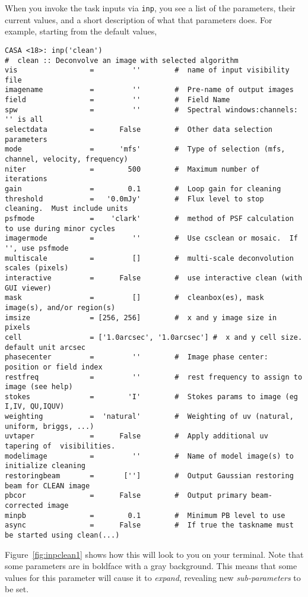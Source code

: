 When you invoke the task inputs via {\tt inp}, you see a list of
the parameters, their current values, and a short description of what
that parameters does.  For example, starting from the default values,
\small
\begin{verbatim}
CASA <18>: inp('clean')
#  clean :: Deconvolve an image with selected algorithm
vis                 =         ''        #  name of input visibility file
imagename           =         ''        #  Pre-name of output images
field               =         ''        #  Field Name
spw                 =         ''        #  Spectral windows:channels: '' is all
selectdata          =      False        #  Other data selection parameters
mode                =      'mfs'        #  Type of selection (mfs, channel, velocity, frequency)
niter               =        500        #  Maximum number of iterations
gain                =        0.1        #  Loop gain for cleaning
threshold           =   '0.0mJy'        #  Flux level to stop cleaning.  Must include units
psfmode             =    'clark'        #  method of PSF calculation to use during minor cycles
imagermode          =         ''        #  Use csclean or mosaic.  If '', use psfmode
multiscale          =         []        #  multi-scale deconvolution scales (pixels)
interactive         =      False        #  use interactive clean (with GUI viewer)
mask                =         []        #  cleanbox(es), mask image(s), and/or region(s)
imsize              = [256, 256]        #  x and y image size in pixels
cell                = ['1.0arcsec', '1.0arcsec'] #  x and y cell size. default unit arcsec
phasecenter         =         ''        #  Image phase center: position or field index
restfreq            =         ''        #  rest frequency to assign to image (see help)
stokes              =        'I'        #  Stokes params to image (eg I,IV, QU,IQUV)
weighting           =  'natural'        #  Weighting of uv (natural, uniform, briggs, ...)
uvtaper             =      False        #  Apply additional uv tapering of  visibilities.
modelimage          =         ''        #  Name of model image(s) to initialize cleaning
restoringbeam       =       ['']        #  Output Gaussian restoring beam for CLEAN image
pbcor               =      False        #  Output primary beam-corrected image
minpb               =        0.1        #  Minimum PB level to use
async               =      False        #  If true the taskname must be started using clean(...)
\end{verbatim}
\normalsize
Figure~\ref{fig:inpclean1} shows how this will look to you on your
terminal.  Note that some parameters are in boldface with a gray
background.  This means that some values for this parameter will 
cause it to {\it expand}, revealing new {\it sub-parameters} to 
be set.

